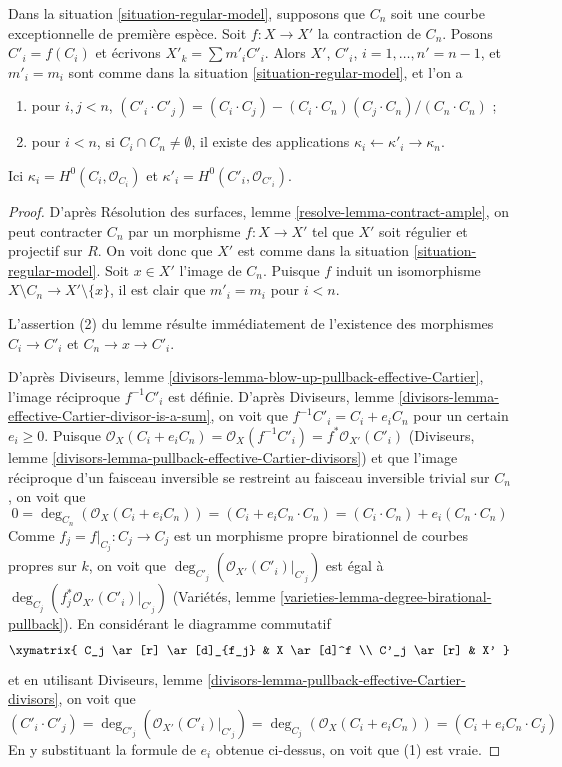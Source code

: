 \begin{lemma}
\label{lemma-blowdown-regular-model}
Dans la situation \ref{situation-regular-model}, supposons que $C_n$ soit
une courbe exceptionnelle de première espèce. Soit $f : X \to X'$ la
contraction de $C_n$. Posons $C'_i = f(C_i)$ et écrivons
$X'_k = \sum m'_iC'_i$. Alors $X'$, $C'_i$, $i = 1, \ldots, n' = n - 1$,
et $m'_i = m_i$ sont comme dans la situation
\ref{situation-regular-model}, et l'on a
\begin{enumerate}
\item pour $i,j<n$,
$(C'_i \cdot C'_j) =
(C_i \cdot C_j) - (C_i \cdot C_n)(C_j \cdot C_n)/(C_n \cdot C_n)$ ;
\item pour $i<n$, si $C_i \cap C_n \not = \emptyset$, il existe des
applications $\kappa_i \leftarrow \kappa'_i \rightarrow \kappa_n$.
\end{enumerate}
Ici $\kappa_i = H^0(C_i, \mathcal{O}_{C_i})$ et
$\kappa'_i = H^0(C'_i, \mathcal{O}_{C'_i})$.
\end{lemma}

\begin{proof}
D'après Résolution des surfaces, lemme
\ref{resolve-lemma-contract-ample}, on peut contracter $C_n$ par un
morphisme $f : X \to X'$ tel que $X'$ soit régulier et projectif sur $R$.
On voit donc que $X'$ est comme dans la situation
\ref{situation-regular-model}. Soit $x \in X'$ l'image de $C_n$.
Puisque $f$ induit un isomorphisme
$X \setminus C_n \to X' \setminus \{x\}$, il est clair que
$m'_i = m_i$ pour $i<n$.

\medskip\noindent
L'assertion (2) du lemme résulte immédiatement de l'existence des
morphismes $C_i \to C'_i$ et $C_n \to x \to C'_i$.

\medskip\noindent
D'après Diviseurs, lemme
\ref{divisors-lemma-blow-up-pullback-effective-Cartier}, l'image réciproque
$f^{-1}C'_i$ est définie. D'après Diviseurs, lemme
\ref{divisors-lemma-effective-Cartier-divisor-is-a-sum}, on voit que
$f^{-1}C'_i = C_i + e_iC_n$ pour un certain $e_i \geq 0$. Puisque
$\mathcal{O}_X(C_i + e_iC_n) = \mathcal{O}_X(f^{-1}C'_i) =
f^*\mathcal{O}_{X'}(C'_i)$
(Diviseurs, lemme \ref{divisors-lemma-pullback-effective-Cartier-divisors})
et que l'image réciproque d'un faisceau inversible se restreint au faisceau
inversible trivial sur $C_n$, on voit que
$$
0 = \deg_{C_n}(\mathcal{O}_X(C_i + e_iC_n)) =
(C_i + e_iC_n \cdot C_n) = (C_i \cdot C_n) + e_i(C_n \cdot C_n)
$$
Comme $f_j = f|_{C_j} : C_j \to C_j$ est un morphisme propre birationnel
de courbes propres sur $k$, on voit que
$\deg_{C'_j}(\mathcal{O}_{X'}(C'_i)|_{C'_j})$ est égal à
$\deg_{C_j}(f_j^*\mathcal{O}_{X'}(C'_i)|_{C'_j})$
(Variétés, lemme \ref{varieties-lemma-degree-birational-pullback}).
En considérant le diagramme commutatif
$$
\xymatrix{
C_j \ar[r] \ar[d]_{f_j} & X \ar[d]^f \\
C'_j \ar[r] & X'
}
$$
et en utilisant Diviseurs, lemme
\ref{divisors-lemma-pullback-effective-Cartier-divisors}, on voit que
$$
(C'_i \cdot C'_j) = \deg_{C'_j}(\mathcal{O}_{X'}(C'_i)|_{C'_j}) =
\deg_{C_j}(\mathcal{O}_X(C_i + e_iC_n)) = (C_i + e_iC_n \cdot C_j)
$$
En y substituant la formule de $e_i$ obtenue ci-dessus, on voit que (1)
est vraie.
\end{proof}

